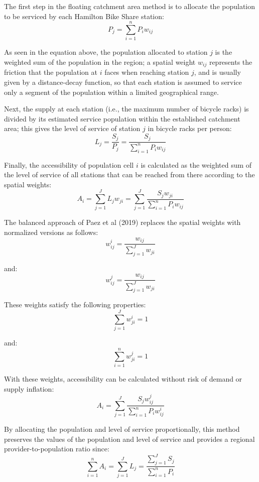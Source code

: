 \documentclass[]{elsarticle} %
\begin{document}
The first step in the floating catchment area method is to allocate the
population to be serviced by each Hamilton Bike Share station: \[
P_j = {\sum_{i = 1}^{n} P_i{w_{ij}}}
\]

As seen in the equation above, the population allocated to station \(j\)
is the weighted sum of the population in the region; a spatial weight
\(w_{ij}\) represents the friction that the population at \(i\) faces
when reaching station \(j\), and is usually given by a distance-decay
function, so that each station is assumed to service only a segment of
the population within a limited geographical range.

Next, the supply at each station (i.e., the maximum number of bicycle
racks) is divided by its estimated service population within the
established catchment area; this gives the level of service of station
\(j\) in bicycle racks per person: \[
L_j = \frac {S_j}{P_j} = \frac {S_j}{{\sum_{i = 1}^{n} P_i{w_{ij}}}}
\]

Finally, the accessibility of population cell \(i\) is calculated as the
weighted sum of the level of service of all stations that can be reached
from there according to the spatial weights: \[
A_i = {\sum_{j = 1}^{J} L_j{w_{ji}}} = {\sum_{j = 1}^{J} \frac {S_j{w_{ji}}}{\sum_{i = 1}^{n} P_i{w_{ij}}}}
\]

The balanced approach of Paez et al (2019) replaces the spatial weights
with normalized versions as follows: \[
{w_{ij}^{i} = \frac {w_{ij}}{\sum_{j = 1}^{J} {w_{ji}}}}
\]

\noindent and: \[
{w_{ij}^{j} = \frac {w_{ij}}{\sum_{j = 1}^{J} {w_{ji}}}}
\]

These weights satisfy the following properties: \[
\sum_{j = 1}^{J} {w^i_{ji}} = 1
\]

\noindent and: \[
\sum_{i = 1}^{n} {w^j_{ji}} = 1
\]

With these weights, accessibility can be calculated without risk of
demand or supply inflation: \[
A_i = {\sum_{j = 1}^{J} \frac {S_j{w^j_{ij}}}{\sum_{i = 1}^{n} P_i{w^i_{ij}}}}
\]

By allocating the population and level of service proportionally, this
method preserves the values of the population and level of service and
provides a regional provider-to-population ratio since: \[
\sum_{i=1}^n A_i = \sum_{j=1}^J L_j = \frac{\sum_{j=1}^JS_j}{\sum_{i=1}^n P_i}
\]
\end{document}
